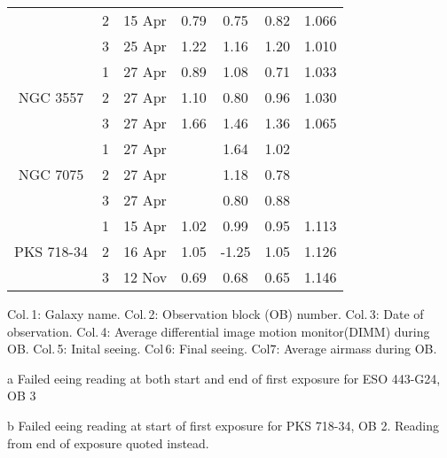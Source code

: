\begin{table}
\begin{threeparttable}
\begin{tabular}{c c c c c c c}
		& 2 & 15 Apr & 0.79 & 0.75 & 0.82 & 1.066 \\
		& 3 & 25 Apr  & 1.22 & 1.16 & 1.20 & 1.010 \\
	\hline
		\multirow{3}{*}{NGC 3557}& 1 & 27 Apr & 0.89 & 1.08 & 0.71 & 1.033 \\
		& 2 & 27 Apr & 1.10 & 0.80 & 0.96 & 1.030 \\
		& 3 & 27 Apr  & 1.66 & 1.46 & 1.36 & 1.065 \\
	\hline
		\multirow{3}{*}{NGC 7075}& 1 & 27 Apr & & 1.64 & 1.02 & \\
		& 2 & 27 Apr & & 1.18 & 0.78 & \\
		& 3 & 27 Apr  & & 0.80 & 0.88 & \\
	\hline
		\multirow{3}{*}{PKS 718-34}& 1 & 15 Apr & 1.02 & 0.99 & 0.95 & 1.113 \\
		& 2 & 16 Apr & 1.05 & -1.25\tnote{b} & 1.05 & 1.126 \\
		& 3 & 12 Nov  & 0.69 & 0.68 & 0.65 & 1.146 \\
	\hline
	\hline
\end{tabular}
	\begin{tablenotes}
	\note Col.\,1: Galaxy name. Col.\,2: Observation block (OB) number. Col.\,3: Date of observation. Col.\,4: Average differential image motion monitor(DIMM) during OB. Col.\,5: Inital seeing. Col\,6: Final seeing. Col\.7: Average airmass during OB.
	\item [a] Failed eeing reading at both start and end of first exposure for ESO 443-G24, OB 3 
	\item [b] Failed eeing reading at start of first exposure for PKS 718-34, OB 2. Reading from end of exposure quoted instead. 
	\end{tablenotes}
\end{threeparttable}
\end{table}